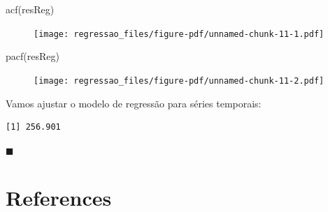 \documentclass[
  letterpaper,
  DIV=11,
  numbers=noendperiod]{scrartcl}
\newenvironment{Shaded}{\begin{snugshade}}{\end{snugshade}}
\newcommand{\AttributeTok}[1]{\textcolor[rgb]{0.40,0.45,0.13}{#1}}
\newcommand{\ConstantTok}[1]{\textcolor[rgb]{0.56,0.35,0.01}{#1}}
\newcommand{\DecValTok}[1]{\textcolor[rgb]{0.68,0.00,0.00}{#1}}
\newcommand{\FunctionTok}[1]{\textcolor[rgb]{0.28,0.35,0.67}{#1}}
\newcommand{\NormalTok}[1]{\textcolor[rgb]{0.00,0.23,0.31}{#1}}
\newcommand{\OtherTok}[1]{\textcolor[rgb]{0.00,0.23,0.31}{#1}}
\newcommand{\SpecialCharTok}[1]{\textcolor[rgb]{0.37,0.37,0.37}{#1}}
\newlength{\cslhangindent}
\newlength{\cslentryspacingunit} %
\newenvironment{CSLReferences}[2] %
 {%
  \setlength{\parindent}{0pt}
  \ifodd #1
  \let\oldpar\par
  \def\par{\hangindent=\cslhangindent\oldpar}
  \fi
  \setlength{\parskip}{#2\cslentryspacingunit}
 }%
 {}
\theoremstyle{plain}
\theoremstyle{plain}
\theoremstyle{definition}
\theoremstyle{definition}
\theoremstyle{remark}
\begin{document}
\begin{Shaded}
\begin{Highlighting}[]
\FunctionTok{acf}\NormalTok{(resReg)}
\end{Highlighting}
\end{Shaded}

\begin{figure}[H]

{\centering \texttt{[image: regressao\_files/figure-pdf/unnamed-chunk-11-1.pdf]}

}

\end{figure}

\begin{Shaded}
\begin{Highlighting}[]
\FunctionTok{pacf}\NormalTok{(resReg)}
\end{Highlighting}
\end{Shaded}

\begin{figure}[H]

{\centering \texttt{[image: regressao\_files/figure-pdf/unnamed-chunk-11-2.pdf]}

}

\end{figure}

Vamos ajustar o modelo de regressão para séries temporais:

\begin{Shaded}
\end{Shaded}

\begin{verbatim}
[1] 256.901
\end{verbatim}

\(\blacksquare\)


\hypertarget{references}{%
\chapter*{References}\label{references}}


\hypertarget{refs}{}
\begin{CSLReferences}{0}{0}
\end{CSLReferences}
\end{document}
